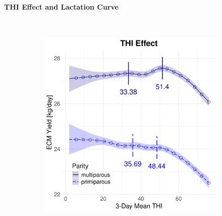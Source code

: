 \paragraph{THI Effect and Lactation Curve} \quad \\
\begin{figure}[H]
    \centering
    \begin{subfigure}[b]{0.45\textwidth}
        \centering
        \includegraphics[width=\textwidth]{thesis/figures/models/ecm/before2010/ho_ecm_before2010/ho_ecm_before2010_marginal_thi_milk_combined.png}
    \end{subfigure}
    \hspace{0.05\textwidth} %
    \begin{subfigure}[b]{0.45\textwidth}
        \centering

\end{subfigure}
\end{figure}
